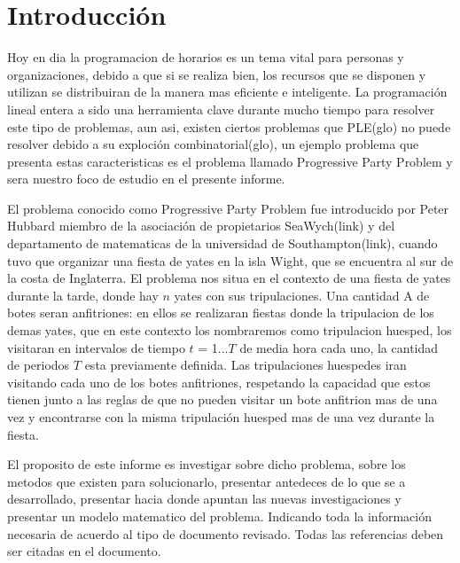 \documentclass[spanish, fleqn]{article}
\begin{document}
\section{Introducción}

Hoy en dia la programacion de horarios es un tema vital para personas y organizaciones, debido a que si se realiza bien, los recursos que se disponen y utilizan se distribuiran de la  manera mas eficiente e inteligente. La programación lineal entera a sido una herramienta clave durante mucho tiempo para resolver este tipo de problemas, aun asi, existen ciertos problemas que PLE(glo) no puede resolver debido a su exploción combinatorial(glo), un ejemplo problema que presenta estas caracteristicas es el problema llamado Progressive Party Problem y sera nuestro foco de estudio en el presente informe.

El problema conocido como Progressive Party Problem fue introducido por Peter Hubbard miembro de la asociación de propietarios SeaWych(link) y del departamento de matematicas de la universidad de Southampton(link), cuando tuvo que organizar una fiesta de yates en la isla Wight, que se encuentra al sur de la costa de Inglaterra. El problema nos situa en el contexto de una fiesta de yates durante la tarde, donde hay $\mathit{n}$ yates con sus tripulaciones. Una cantidad $\mathrm{A}$ de botes seran anfitriones: en ellos se realizaran fiestas donde la tripulacion de los demas yates, que en este contexto los nombraremos como tripulacion huesped, los visitaran en intervalos de tiempo $\mathit{t}$ = 1...$\mathit{T}$ de media hora cada uno, la cantidad de periodos $\mathit{T}$ esta previamente definida. Las tripulaciones huespedes iran visitando cada uno de los botes anfitriones, respetando la capacidad que estos tienen junto a las reglas de que no pueden visitar un bote anfitrion mas de una vez y encontrarse con la misma tripulación huesped mas de una vez durante la fiesta.

El proposito de este informe es investigar sobre dicho problema, sobre los metodos que existen para solucionarlo, presentar antedeces de lo que se a desarrollado, presentar hacia donde apuntan las nuevas investigaciones y presentar un modelo matematico del problema.
Indicando toda la informaci\'on necesaria de acuerdo al tipo de documento revisado. Todas las referencias deben ser citadas en el documento.


\end{document}
